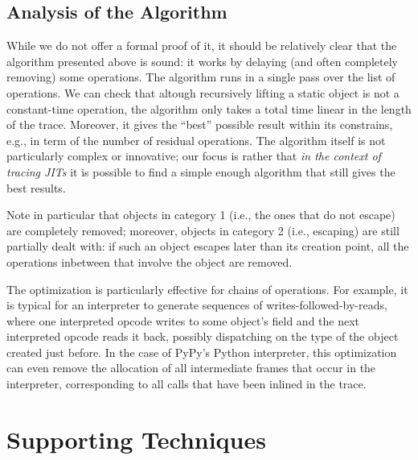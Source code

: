 \documentclass[preprint]{sigplanconf}
\newcommand\ie{i.e.,\xspace}
\newcommand\eg{e.g.,\xspace}
\begin{document}

\subsection{Analysis of the Algorithm}
\label{sub:analysis}

While we do not offer a formal proof of it, it should be relatively clear
that the algorithm presented above is sound: it works by delaying (and
often completely removing) some operations.  The algorithm runs in a
single pass over the list of operations.  We can check that altough
recursively lifting a static object is not a constant-time operation,
the algorithm only takes a total time linear in the length of the trace.
Moreover, it gives the ``best'' possible result within its constrains,
\eg in term of the number of residual operations.  The
algorithm itself is not particularly complex or innovative; our focus is
rather that \emph{in the context of tracing JITs} it is possible to find a
simple enough algorithm that still gives the best results.

Note in particular that objects in category 1 (\ie the ones that do
not escape) are completely removed; moreover, objects in category 2
(\ie escaping) are still partially dealt with: if such an object
escapes later than its creation point, all the operations inbetween that
involve the object are removed.

The optimization is particularly effective for chains of operations.
For example, it is typical for an interpreter to generate sequences of
writes-followed-by-reads, where one interpreted opcode writes to some
object's field and the next interpreted opcode reads it back, possibly
dispatching on the type of the object created just before.  In the case
of PyPy's Python interpreter, this optimization can even remove the
allocation of all intermediate frames that occur in the interpreter,
corresponding to all calls that have been inlined in the trace.





\section{Supporting Techniques}
\label{sec:support}
\end{document}
